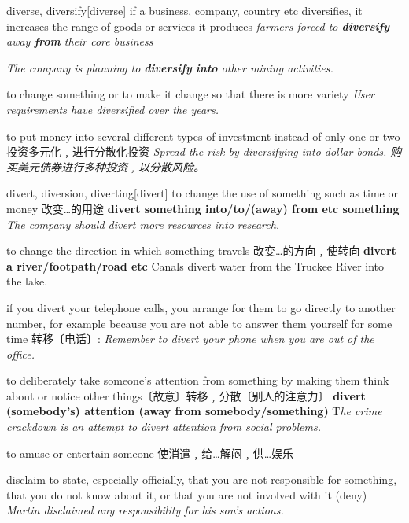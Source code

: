 \begin{DefWord}{diverse, diversify}[diverse]
    if a business, company, country etc diversifies, it increases the range of goods or services it produces
    \textit{farmers forced to \textbf{diversify} away \textbf{from} their core business}

    \textit{The company is planning to \textbf{diversify} \textbf{into} other mining activities.}

    to change something or to make it change so that there is more variety
    \textit{User requirements have diversified over the years.}

    to put money into several different types of investment instead of only one or two 投资多元化﹐进行分散化投资
    \textit{Spread the risk by diversifying into dollar bonds. 购买美元债券进行多种投资﹐以分散风险。}

\end{DefWord}

\begin{DefWord}{divert, diversion, diverting}[divert]
    to change the use of something such as time or money 改变…的用途
    \textbf{divert something into/to/(away) from etc something}
    \textit{The company should divert more resources into research.}

    to change the direction in which something travels 改变…的方向﹐使转向
    \textbf{divert a river/footpath/road etc}
    Canals divert water from the Truckee River into the lake.

    if you divert your telephone calls, you arrange for them to go directly to another number, for example because you are not able to answer them yourself for some time 转移〔电话〕:
    \textit{Remember to divert your phone when you are out of the office.}

    to deliberately take someone’s attention from something by making them think about or notice other things〔故意〕转移﹐分散〔别人的注意力〕
    \textbf{divert (somebody’s) attention (away from somebody/something)}
    T\textit{he crime crackdown is an attempt to divert attention from social problems.}
 
    to amuse or entertain someone 使消遣﹐给…解闷﹐供…娱乐

\end{DefWord}


\begin{DefWord}{disclaim}
    to state, especially officially, that you are not responsible for something, that you do not know about it, or that you are not involved with it (deny)
    \textit{Martin disclaimed any responsibility for his son’s actions.}
\end{DefWord}